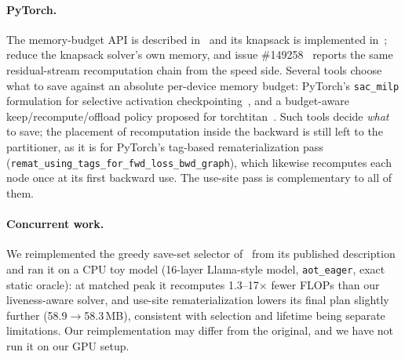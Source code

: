 \documentclass[10pt]{article}
\newcommand{\code}[1]{\texttt{#1}}
\begin{document}
\paragraph{PyTorch.} The memory-budget API is described in~\citep{pytorchblog2025} and its knapsack is implemented
in~\citep{torchpartitioners};
\citet{maczan2026knapsack} reduce the knapsack solver's own memory, and issue \#149258~\citep{issue149258} reports the
same residual-stream recomputation chain from the speed side. Several tools choose what to save against an absolute
per-device memory budget: PyTorch's \code{sac\_milp} formulation for selective activation
checkpointing~\citep{sacilp}, and a budget-aware keep/recompute/offload policy proposed for
torchtitan~\citep{torchtitan4636}. Such tools decide \emph{what} to save; the placement of recomputation inside the
backward is still left to the partitioner, as it is for PyTorch's tag-based rematerialization pass
(\code{remat\_using\_tags\_for\_fwd\_loss\_bwd\_graph}), which likewise recomputes each node once at its first backward use. The use-site pass is complementary to all of them.
\paragraph{Concurrent work.}
We reimplemented the greedy save-set selector of~\citet{somers2026checkpointing} from its published description and ran
it on a CPU toy model (16-layer Llama-style model, \code{aot\_eager}, exact static oracle): at matched peak it recomputes
1.3--17$\times$ fewer FLOPs than our liveness-aware solver, and use-site rematerialization lowers its final plan slightly
further (58.9$\to$58.3\,MB), consistent with selection and lifetime being separate limitations. Our reimplementation may
differ from the original, and we have not run it on our GPU setup.

\end{document}
